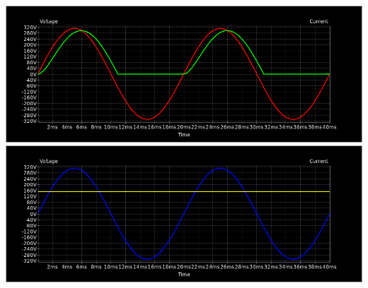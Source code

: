 \documentclass[12pt,a4paper]{article}
\begin{document}
\begin{center}
\includegraphics[scale=0.5]{imagenes/p1/P12.png} \\
\includegraphics[scale=0.5]{imagenes/p1/P121.png} 
\end{center}
\end{document}
